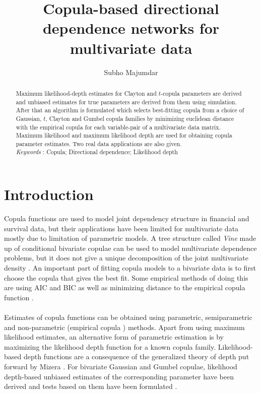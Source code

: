 \documentclass[11pt]{llncs}
\begin{document}
\title{Copula-based directional dependence networks for multivariate data}
\author{Subho Majumdar}
\maketitle

\begin{abstract}
Maximum likelihood-depth estimates for Clayton and $t$-copula parameters are derived and unbiased estimates for true parameters are derived from them using simulation. After that an algorithm is formulated which selects best-fitting copula from a choice of Gaussian, $t$, Clayton and Gumbel copula families by minimizing euclidean distance with the empirical copula for each variable-pair of a multivariate data matrix. Maximum likelihood and maximum likelihood depth are used for obtaining copula parameter estimates. Two real data applications are also given.\\

\textit{Keywords} : Copula; Directional dependence; Likelihood depth
\end{abstract}

\section{Introduction}Copula functions are used to model joint dependency structure in financial and survival data, but their applications have been limited for multivariate data mostly due to limitation of parametric models. A tree structure called \textit{Vine} made up of conditional bivariate copulae can be used to model multivariate dependence problems, but it does not give a unique decomposition of the joint multivariate density \cite{vine}. An important part of fitting copula models to a bivariate data is to first choose the copula that gives the best fit. Some empirical methods of doing this are using AIC and BIC \cite{aicbiccop} as well as minimizing distance to the empirical copula function \cite{empcop}.

\paragraph{}Estimates of copula functions can be obtained using parametric, semiparametric \cite{genest}\cite{hoff} and non-parametric (empirical copula \cite{caparaa}) methods. Apart from using maximum likelihood estimates, an alternative form of parametric estimation is by maximizing the likelihood depth function for a known copula family. Likelihood-based depth functions \cite{mizera2} are a consequence of the generalized theory of depth put forward by Mizera \cite{mizera1}. For bivariate Gaussian and Gumbel copulae, likelihood depth-based unbiased estimates of the corresponding parameter have been derived and tests based on them have been formulated \cite{copdepth}.
\end{document}
